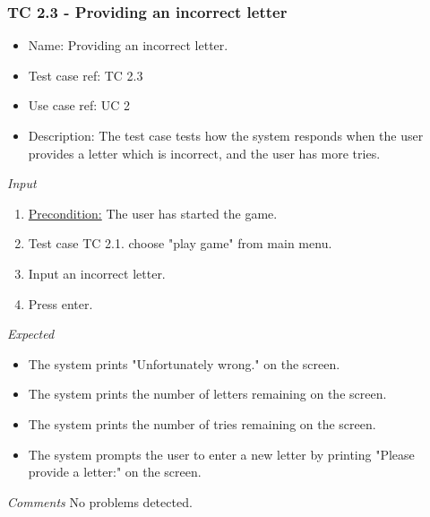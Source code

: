 \documentclass[12pt, letterpaper]{article}
\begin{document}
\subsubsection{TC 2.3 - Providing an incorrect letter}
\begin{itemize}
	\item Name: Providing an incorrect letter.
	\item Test case ref: TC 2.3
	\item Use case ref: UC 2
	\item Description: The test case tests how the system responds when the user provides a letter which is incorrect, and the user has more tries.
\end{itemize}
\emph{Input}
\begin{enumerate}
	\item \underline{Precondition:} The user has started the game.
	\item Test case TC 2.1. choose "play game" from main menu.
	\item Input an incorrect letter.
	\item Press enter.
\end{enumerate}
\emph{Expected}
\begin{itemize}
	\item The system prints "Unfortunately wrong." on the screen.
	\item The system prints the number of letters remaining on the screen.
	\item The system prints the number of tries remaining on the screen.
	\item The system prompts the user to enter a new letter by printing "Please provide a letter:" on the screen.
\end{itemize}
\begin{Form}
	\newline
	\newline
\end{Form}
\newline
\emph{Comments}
No problems detected.
\end{document}
